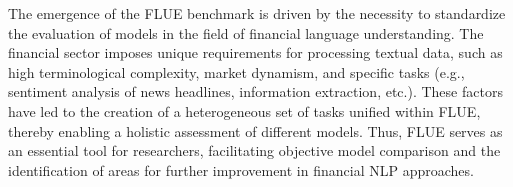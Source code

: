The emergence of the FLUE benchmark is driven by the necessity to standardize the evaluation of models in the field of financial
language understanding. The financial sector imposes unique requirements for processing textual data, such as high terminological
complexity, market dynamism, and specific tasks (e.g., sentiment analysis of news headlines, information extraction, etc.). These
factors have led to the creation of a heterogeneous set of tasks unified within FLUE, thereby enabling a holistic assessment
of different models. Thus, FLUE serves as an essential tool for researchers, facilitating objective model comparison
and the identification of areas for further improvement in financial NLP approaches.